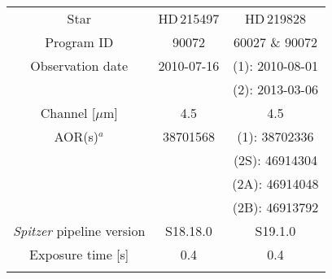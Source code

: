 \documentclass[traditabstract]{aa}
\begin{document}
\begin{appendix}
\begin{table*}
\begin{center}
{\scriptsize
\label{tab:targets}
\begin{tabular}{ccc}
\hline\noalign {\smallskip}
Star &  HD\,215497 & HD\,219828       \\ \noalign {\smallskip}
\hline \noalign {\smallskip}  
Program ID                                                          & 90072                                & 60027 \& 90072                                      \\ \noalign {\smallskip} 
Observation date                                                 & 2010-07-16                       & (1): 2010-08-01                             \\ \noalign {\smallskip}       
                                                                             &                                           & (2): 2013-03-06                               \\ \noalign {\smallskip}       
Channel       [$\mu$m]                                         & 4.5                                    & 4.5                                            \\ \noalign {\smallskip} 
AOR(s)$^{a}$                                                      & 38701568                           & (1): 38702336                          \\ \noalign {\smallskip}    
                                                                            &                                            & (2S): 46914304                                \\ \noalign {\smallskip}          
                                                                           &                                            & (2A): 46914048                                \\ \noalign {\smallskip}          
                                                                           &                                            & (2B): 46913792                                \\ \noalign {\smallskip}          
{\it Spitzer} pipeline version                               & S18.18.0                                 & S19.1.0                                     \\ \noalign {\smallskip}     
Exposure time [s]                                               & 0.4                                       & 0.4                                             \\ \noalign {\smallskip} 

\end{tabular}}
\end{center}
\end{table*}
\end{appendix}
\end{document}
